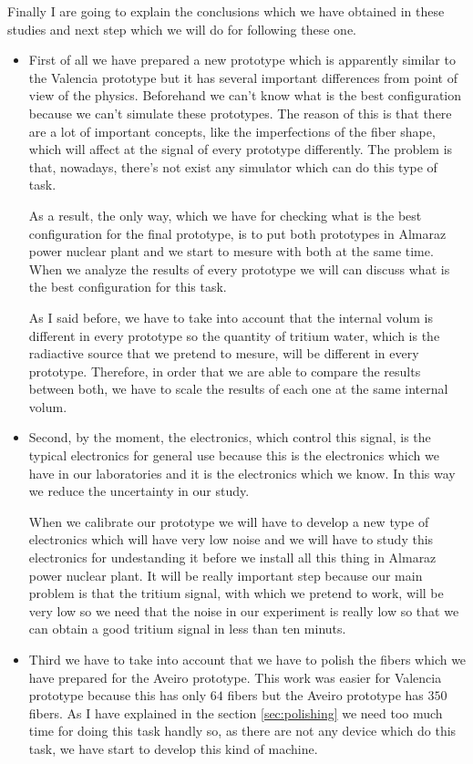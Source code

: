 Finally I are going to explain the conclusions which we have obtained in these studies and next step which we will do for following these one.
\begin{itemize}
\item{} First of all we have prepared a new prototype which is apparently similar to the Valencia prototype but it has several important differences from point of view of the physics. Beforehand we can't know what is the best configuration because we can't simulate these prototypes. The reason of this is that there are a lot of important concepts, like the imperfections of the fiber shape, which will affect at the signal of every prototype differently. The problem is that, nowadays, there's not exist any simulator which can do this type of task.

As a result, the only way, which we have for checking what is the best configuration for the final prototype, is to put both prototypes in Almaraz power nuclear plant and we start to mesure with both at the same time. When we analyze the results of every prototype we will can discuss what is the best configuration for this task. 

As I said before, we have to take into account that the internal volum is different in every prototype so the quantity of tritium water, which is the radiactive source that we pretend to mesure, will be different in every prototype. Therefore, in order that we are able to compare the results between both, we have to scale the results of each one at the same internal volum.

\item{} Second, by the moment, the electronics, which control this signal, is the typical electronics for general use because this is the electronics which we have in our laboratories and it is the electronics which we know. In this way we reduce the uncertainty in our study.

When we calibrate our prototype we will have to develop a new type of electronics which will have very low noise and we will have to study this electronics for undestanding it before we install all this thing in Almaraz power nuclear plant. It will be really important step because our main problem is that the tritium signal, with which we pretend to work, will be very low so we need that the noise in our experiment is really low so that we can obtain a good tritium signal in less than ten minuts.

\item{} Third we have to take into account that we have to polish the fibers which we have prepared for the Aveiro prototype. This work was easier for Valencia prototype because this has only $64$ fibers but the Aveiro prototype has $350$ fibers. As I have explained in the section \ref{sec:polishing} we need too much time for doing this task handly so, as there are not any device which do this task, we have start to develop this kind of machine.


\end{itemize}
